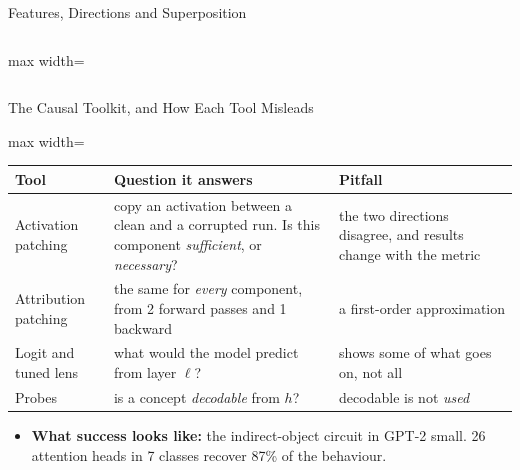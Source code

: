 \begin{frame}{Features, Directions and Superposition}
\begin{columns}[T,onlytextwidth]
\begin{adjustbox}{max width=\linewidth}
\begin{tikzpicture}[font=\scriptsize, >=Stealth]
        \end{tikzpicture}\end{adjustbox}
    \end{columns}
    \vspace{0.2em}
\end{frame}

\begin{frame}{The Causal Toolkit, and How Each Tool Misleads}
    \begin{center}
    \footnotesize
    \renewcommand{\arraystretch}{1.15}
    \begin{adjustbox}{max width=\linewidth}\begin{tabular}{>{\raggedright\arraybackslash}p{2.5cm}>{\raggedright\arraybackslash}p{5.7cm}>{\raggedright\arraybackslash}p{4.5cm}}
        \toprule
        \textbf{Tool} & \textbf{Question it answers} & \textbf{Pitfall} \\
        \midrule
        Activation patching & copy an activation between a clean and a corrupted run. Is this component \emph{sufficient}, or \emph{necessary}? & the two directions disagree, and results change with the metric \\
        Attribution patching & the same for \emph{every} component, from 2 forward passes and 1 backward & a first-order approximation \\
        Logit and tuned lens & what would the model predict from layer $\ell$? & shows some of what goes on, not all \\
        Probes & is a concept \emph{decodable} from $h$? & decodable is not \emph{used} \\
        \bottomrule
    \end{tabular}\end{adjustbox}
    \end{center}
    \begin{itemize}\itemsep0.25em
        \item \textbf{What success looks like:} the indirect-object circuit in GPT-2 small. 26 attention heads in 7 classes recover 87\% of the behaviour.
    \end{itemize}
\end{frame}


